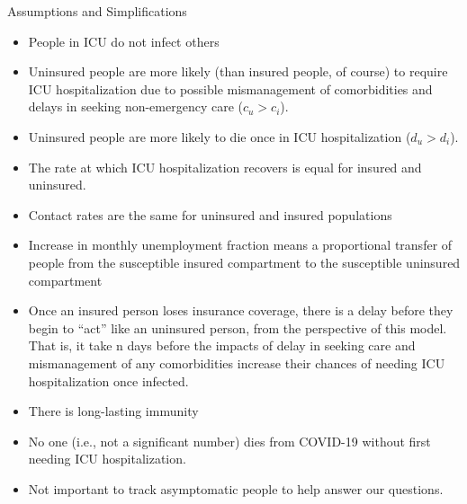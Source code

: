 \documentclass[notes]{beamer}
\begin{document}
\begin{frame}[shrink=25]{Assumptions and Simplifications}




\begin{itemize}
    \item<1-> People in ICU do not infect others
    \item<2-> Uninsured people are more likely (than insured people, of course) to require ICU hospitalization due to possible mismanagement of comorbidities and delays in seeking non-emergency care ($c_u > c_i$).
\item<3-> Uninsured people are more likely to die once in ICU hospitalization ($d_u > d_i$).
 \item<4-> The rate at which ICU hospitalization recovers is equal for insured and uninsured.
\item<5-> Contact rates are the same for uninsured and insured populations
\item<6-> Increase in monthly unemployment fraction means a proportional transfer of people from the susceptible insured compartment to the susceptible uninsured compartment
\item<7-> Once an insured person loses insurance coverage, there is a delay before they begin to “act” like an uninsured person, from the perspective of this model. That is, it take n days before the impacts of delay in seeking care and mismanagement of any comorbidities increase their chances of needing ICU hospitalization once infected.

\item<8-> There is long-lasting immunity 

    \item<9-> No one (i.e., not a significant number) dies from COVID-19 without first needing ICU hospitalization. 
\item<10-> Not important to track asymptomatic people to help answer our questions.

    
\end{itemize}


 

 

 
 
 
 





\end{frame}
\end{document}
